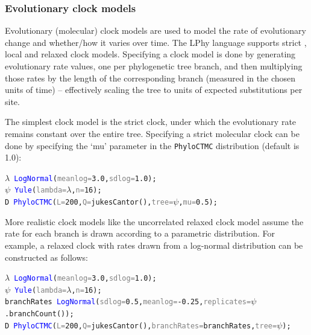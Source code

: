 \documentclass[10pt,letterpaper,table]{article}
\theoremstyle{definition}
\begin{document}
\subsubsection{Evolutionary clock models}
\label{sec:clockmodels}

Evolutionary (molecular) clock models are used to model the rate of evolutionary change and whether/how it varies over time. The LPhy language supports strict \cite{zuckerkandl1965evolutionary, zuckerkandl1965molecules}, local \cite{drummond2010bayesian} and relaxed clock \cite{drummond2006relaxedconfidence} models. 
Specifying a clock model is done by generating evolutionary rate values, one per phylogenetic tree branch, and then multiplying those rates by the length of the corresponding branch (measured in the chosen units of time) -- effectively scaling the tree to units of expected substitutions per site. 

The simplest clock model is the strict clock, under which the evolutionary rate remains constant over the entire tree. Specifying a strict molecular clock can be done by specifying the `mu' parameter in the \texttt{PhyloCTMC} distribution (default is 1.0):
{\small
\begin{alltt}
    \textcolor{bluishgreen}{\(\lambda\)} ~ \textcolor{blue}{LogNormal}(\textcolor{gray}{meanlog=}\textcolor{constant}{3.0}, \textcolor{gray}{sdlog=}\textcolor{constant}{1.0});
    \textcolor{bluishgreen}{\(\psi\)} ~ \textcolor{blue}{Yule}(\textcolor{gray}{lambda=}\textcolor{bluishgreen}{\(\lambda\)}, \textcolor{gray}{n=}\textcolor{constant}{16});
    \textcolor{bluishgreen}{D} ~ \textcolor{blue}{PhyloCTMC}(\textcolor{gray}{L=}\textcolor{constant}{200}, \textcolor{gray}{Q=}\textcolor{generator}{jukesCantor}(), \textcolor{gray}{tree=}\textcolor{bluishgreen}{\(\psi\)}, \textcolor{gray}{mu=}\textcolor{constant}{0.5});
\end{alltt}
}
More realistic clock models like the uncorrelated relaxed clock model \cite{drummond2006relaxedconfidence} assume the rate for each branch is drawn according to a parametric distribution. For example, a relaxed clock with rates drawn from a log-normal distribution can be constructed as follows:

{
\small
\begin{alltt}
  \textcolor{bluishgreen}{\(\lambda\)} ~ \textcolor{blue}{LogNormal}(\textcolor{gray}{meanlog=}\textcolor{constant}{3.0}, \textcolor{gray}{sdlog=}\textcolor{constant}{1.0});
  \textcolor{bluishgreen}{\(\psi\)} ~ \textcolor{blue}{Yule}(\textcolor{gray}{lambda=}\textcolor{bluishgreen}{\(\lambda\)}, \textcolor{gray}{n=}\textcolor{constant}{16});
  \textcolor{bluishgreen}{branchRates} ~ \textcolor{blue}{LogNormal}(\textcolor{gray}{sdlog=}\textcolor{constant}{0.5}, \textcolor{gray}{meanlog=}\textcolor{constant}{-0.25}, \textcolor{gray}{replicates=}\textcolor{bluishgreen}{\(\psi\)}.\textcolor{generator}{branchCount}());
  \textcolor{bluishgreen}{D} ~ \textcolor{blue}{PhyloCTMC}(\textcolor{gray}{L=}\textcolor{constant}{200}, \textcolor{gray}{Q=}\textcolor{generator}{jukesCantor}(), \textcolor{gray}{branchRates=}\textcolor{bluishgreen}{branchRates}, \textcolor{gray}{tree=}\textcolor{bluishgreen}{\(\psi\)});
\end{alltt}
}
\end{document}
